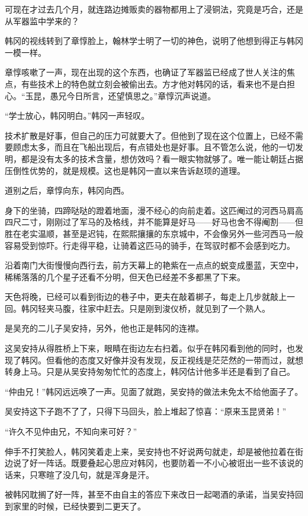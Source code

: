 可现在才过去几个月，就连路边摊贩卖的器物都用上了浸铜法，究竟是巧合，还是从军器监中学来的？

韩冈的视线转到了章惇脸上，翰林学士明了一切的神色，说明了他想到得正与韩冈一模一样。

章惇咳嗽了一声，现在出现的这个东西，也确证了军器监已经成了世人关注的焦点，有些技术上的特色就立刻会被偷出去。方才他对韩冈的话，看来也不是白担心。“玉昆，愚兄今日所言，还望慎思之。”章惇沉声说道。

“学士放心，韩冈明白。”韩冈一声轻叹。

技术扩散是好事，但自己的压力可就要大了。但他到了现在这个位置上，已经不需要顾虑太多，而且在飞船出现后，有点错处也是好事。且不管怎么说，他的一切发明，都是没有太多的技术含量，想仿效吗？看一眼实物就够了。唯一能让朝廷占据压倒性优势的，就是规模。这也是韩冈一直以来告诉赵顼的道理。

道别之后，章惇向东，韩冈向西。

身下的坐骑，四蹄哒哒的蹬着地面，漫不经心的向前走着。这匹阉过的河西马肩高四尺二寸，刚刚过了军马的及格线，并不能算是好马——好马也舍不得阉割——但胜在老实温顺，甚至是迟钝，在熙熙攘攘的东京城中，不会像另外一些河西马一般容易受到惊吓。行走得平稳，让骑着这匹马的骑手，在驾驭时都不会感到吃力。

沿着南门大街慢慢向西行去，前方天幕上的艳紫在一点点的蜕变成墨蓝，天空中，稀稀落落的几个星子还看不分明，但天色已经差不多都黑了下来。

天色将晚，已经可以看到街边的巷子中，更夫在敲着梆子，每走上几步就敲上一回。韩冈轻夹马腹，往家中赶去。只是刚到浚仪桥，就见到了一个熟人。

是吴充的二儿子吴安持，另外，他也正是韩冈的连襟。

这吴安持从得胜桥上下来，眼睛在街边左右扫着。似乎在韩冈看到他的同时，也发现了韩冈。但看他的态度又好像并没有发现，反正视线是茫茫然的一带而过，就想转身上马。只是从吴安持匆匆忙忙的态度上，韩冈估计他多半还是看到了自己。

“仲由兄！”韩冈远远唤了一声。见面了就跑，吴安持的做法未免太不给他面子了。

吴安持这下子跑不了了，只得下马回头，脸上堆起了惊喜：“原来玉昆贤弟！”

“许久不见仲由兄，不知向来可好？”

伸手不打笑脸人，韩冈笑着走上来，吴安持也不好说两句就走，却是被他拉着在街边说了好一阵话。既要叠起心思应对韩冈，也要防着一不小心被诳出一些不该说的话来，只寒暄了没几句，就是浑身是汗。

被韩冈耽搁了好一阵，甚至不由自主的答应下来改日一起喝酒的承诺，当吴安持回到家里的时候，已经快要到二更天了。

